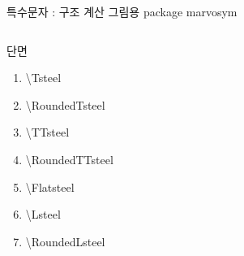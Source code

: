 \documentclass[ aspectratio=169,  12pt,blue,xcolor=pdftex,dvipsnames,table,handout,notes]{beamer}
\begin{document}
\begin{frame}[t,shrink=0]{특수문자 : 구조 계산 그림용 package marvosym}
\begin{columns}[t]
\begin{column}{.4\textwidth}
\begin{block} { 단면 }
\begin{enumerate}
			\item[\Tsteel			]	\textbackslash Tsteel	
			\item[\RoundedTsteel	]	\textbackslash RoundedTsteel	
			\item[\TTsteel		]	\textbackslash TTsteel	
			\item[\RoundedTTsteel	]	\textbackslash RoundedTTsteel
			\item[\Flatsteel		]	\textbackslash Flatsteel	
			\item[\Lsteel			]	\textbackslash Lsteel	
			\item[\RoundedLsteel	]	\textbackslash RoundedLsteel	
			\end{enumerate}
			\end{block}
			\end{column}
			\end{columns}

		\end{frame}




\end{document}
